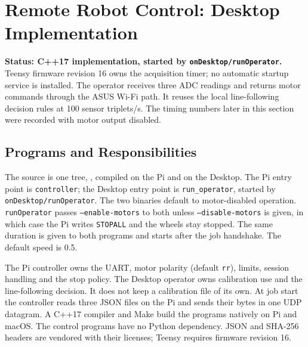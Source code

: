 \clearpage
\section{Remote Robot Control: Desktop Implementation}
\label{sec:remote-control}
\textbf{Status: C++17 implementation, started by \texttt{onDesktop/runOperator}.} Teensy firmware revision 16 owns the acquisition timer; no automatic startup service is installed. The operator receives three ADC readings and returns motor commands through the ASUS Wi-Fi path. It reuses the local line-following decision rules at 100 sensor triplets/s. The timing numbers later in this section were recorded with motor output disabled.

\subsection{Programs and Responsibilities}
The source is one tree, , compiled on the Pi and on the Desktop. The Pi entry point is \texttt{controller}; the Desktop entry point is \texttt{run\_operator}, started by \texttt{onDesktop/runOperator}. The two binaries default to motor-disabled operation. \texttt{runOperator} passes \texttt{--enable-motors} to both unless \texttt{--disable-motors} is given, in which case the Pi writes \texttt{STOPALL} and the wheels stay stopped. The same duration is given to both programs and starts after the job handshake. The default speed is 0.5.

The Pi controller owns the UART, motor polarity (default \texttt{rr}), limits, session handling and the stop policy. The Desktop operator owns calibration use and the line-following decision. It does not keep a calibration file of its own. At job start the controller reads three JSON files on the Pi and sends their bytes in one UDP datagram. A C++17 compiler and Make build the programs natively on Pi and macOS. The control programs have no Python dependency. JSON and SHA-256 headers are vendored with their licenses; Teensy requires firmware revision 16.

